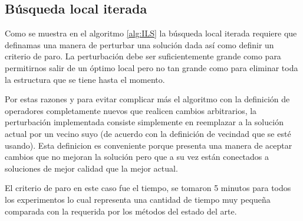 \subsection*{Búsqueda local iterada}
Como se muestra en el algoritmo \ref{alg:ILS} la búsqueda local iterada requiere que definamas una manera de perturbar una solución dada así como definir un criterio de paro. La perturbación debe ser suficientemente grande como para permitirnos salir de un óptimo local pero no tan grande como para eliminar toda la estructura que se tiene hasta el momento.

Por estas razones y para evitar complicar más el algoritmo con la definición de operadores completamente nuevos que realicen cambios arbitrarios, la perturbación implementada consiste simplemente en reemplazar a la solución actual por un vecino suyo (de acuerdo con la definición de vecindad que se esté usando). Esta definicion es conveniente porque presenta una manera de aceptar cambios que no mejoran la solución pero que a su vez están conectados a soluciones de mejor calidad que la mejor actual.

 El criterio de paro en este caso fue el tiempo, se tomaron 5 minutos para todos los experimentos lo cual representa una cantidad de tiempo muy pequeña comparada con la requerida por los métodos del estado del arte.

